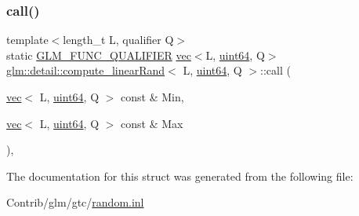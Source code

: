 \subsubsection{\texorpdfstring{call()}{call()}}
{\footnotesize\ttfamily template$<$length\+\_\+t L, qualifier Q$>$ \\
static \mbox{\hyperlink{setup_8hpp_a33fdea6f91c5f834105f7415e2a64407}{G\+L\+M\+\_\+\+F\+U\+N\+C\+\_\+\+Q\+U\+A\+L\+I\+F\+I\+ER}} \mbox{\hyperlink{structglm_1_1vec}{vec}}$<$L, \mbox{\hyperlink{namespaceglm_1_1detail_adec4b19bf4982125e122db2fe03c5810}{uint64}}, Q$>$ \mbox{\hyperlink{structglm_1_1detail_1_1compute__linear_rand}{glm\+::detail\+::compute\+\_\+linear\+Rand}}$<$ L, \mbox{\hyperlink{namespaceglm_1_1detail_adec4b19bf4982125e122db2fe03c5810}{uint64}}, Q $>$\+::call (\begin{DoxyParamCaption}\item[{\mbox{\hyperlink{structglm_1_1vec}{vec}}$<$ L, \mbox{\hyperlink{namespaceglm_1_1detail_adec4b19bf4982125e122db2fe03c5810}{uint64}}, Q $>$ const \&}]{Min,  }\item[{\mbox{\hyperlink{structglm_1_1vec}{vec}}$<$ L, \mbox{\hyperlink{namespaceglm_1_1detail_adec4b19bf4982125e122db2fe03c5810}{uint64}}, Q $>$ const \&}]{Max }\end{DoxyParamCaption})\hspace{0.3cm}{\ttfamily [inline]}, {\ttfamily [static]}}



The documentation for this struct was generated from the following file\+:\begin{DoxyCompactItemize}
\item 
Contrib/glm/gtc/\mbox{\hyperlink{random_8inl}{random.\+inl}}\end{DoxyCompactItemize}
